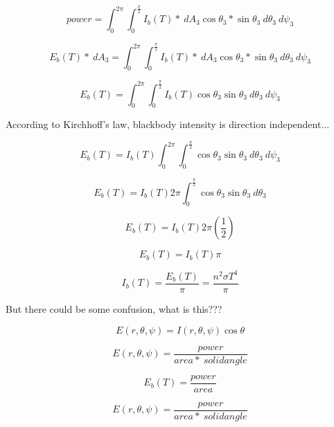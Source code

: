 \documentclass[12pt]{article}
\renewcommand{\_}{\kern-1.5pt\textunderscore\kern-1.5pt}
\begin{document}
 \[ power= \int _{0}^{2 \pi } \int _{0}^{\frac{ \pi }{2}}I_{b} \left( T \right) \ast~dA_{3}\cos  \theta _{3}\ast\sin  \theta _{3}~d \theta _{3}~d \psi _{3} \] \par

 \[ E_{b} \left( T \right) \ast~dA_{3}= \int _{0}^{2 \pi } \int _{0}^{\frac{ \pi }{2}}I_{b} \left( T \right) \ast~dA_{3}\cos  \theta _{3}\ast\sin  \theta _{3}~d \theta _{3}~d \psi _{3} \] \par

 \[ E_{b} \left( T \right) = \int _{0}^{2 \pi } \int _{0}^{\frac{ \pi }{2}}I_{b} \left( T \right) \cos  \theta _{3}\sin  \theta _{3}~d \theta _{3}~d \psi _{3} \] \par

According to Kirchhoff’s law, blackbody intensity is direction independent$ \ldots $ \par

 \[ E_{b} \left( T \right) =I_{b} \left( T \right)  \int _{0}^{2 \pi } \int _{0}^{\frac{ \pi }{2}}\cos  \theta _{3}\sin  \theta _{3}~d \theta _{3}~d \psi _{3} \] \par

 \[ E_{b} \left( T \right) =I_{b} \left( T \right)  2 \pi  \int _{0}^{\frac{ \pi }{2}}\cos  \theta _{3}\sin  \theta _{3}~d \theta _{3} \] \par

 \[ E_{b} \left( T \right) =I_{b} \left( T \right)  2 \pi  \left( \frac{1}{2} \right)  \] \par

 \[ E_{b} \left( T \right) =I_{b} \left( T \right)   \pi  \] \par

 \[ I_{b} \left( T \right) =\frac{E_{b} \left( T \right) }{ \pi }=\frac{n^{2} \sigma T^{4}}{ \pi } \] \par

But there could be some confusion, what is this???\par

 \[ E \left( r, \theta , \psi  \right)  =I \left( r, \theta , \psi  \right) \cos  \theta  \] \par

 \[ E \left( r, \theta , \psi  \right) =\frac{power}{area\ast~solid angle} \] \par

 \[ E_{b} \left( T \right) =\frac{power}{area} \] \par

 \[ E \left( r, \theta , \psi  \right) =\frac{power}{area\ast~solid angle} \] \par
\end{document}
